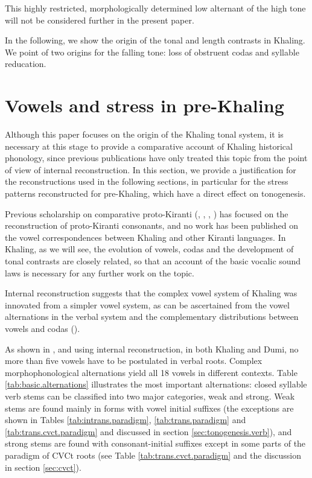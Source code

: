 \documentclass[oldfontcommands,oneside,a4paper,11pt]{article}
\begin{document}
This highly restricted, morphologically determined low alternant of the high tone will not be considered further in the present paper.


In the following, we show the origin of the tonal and length contrasts in Khaling. We point of two origins for the falling tone: loss of obstruent codas and syllable reducation.

\section{Vowels and stress in pre-Khaling}
Although this paper focuses on the origin of the Khaling tonal system, it is necessary at this stage to provide a comparative account of Khaling historical phonology, since previous publications have only treated this topic from the point of view of internal reconstruction. In this section, we provide a justification for the reconstructions used in the following sections,   in particular   for the stress patterns reconstructed for pre-Khaling, which have a direct effect on tonogenesis.

Previous scholarship on comparative proto-Kiranti (\citealt{driem90r}, \citealt{michailovsky94stops}, \citealt{starostin94kiranti}, \citealt{opgenort05jero}) has focused on the reconstruction of proto-Kiranti consonants, and no work has been published on the vowel correspondences between Khaling and other Kiranti languages. In Khaling, as we will see, the evolution of vowels, codas and the development of tonal contrasts are closely related, so that an account of the basic vocalic sound laws is necessary for any further work on the topic.

Internal reconstruction suggests that the complex vowel system of Khaling was innovated from a simpler vowel system, as can be ascertained from the vowel alternations in the verbal system and the complementary distributions between vowels and codas (\citealt{jacques12khaling}). 

As shown in \citet{michailovsky75khaling}, \citet{jacques12khaling} and \citet{michailovsky12dumi} using internal reconstruction, in both Khaling and Dumi, no more than five vowels have to be postulated in verbal roots. Complex morphophonological alternations yield all 18 vowels in different contexts. Table \ref{tab:basic.alternations} illustrates  the most important alternations: closed syllable  verb stems can be classified into two major categories, weak and strong. Weak stems are found mainly in forms with vowel initial suffixes (the exceptions are shown in Tables \ref{tab:intrans.paradigm}, \ref{tab:trans.paradigm} and \ref{tab:trans.cvct.paradigm} and discussed in section \ref{sec:tonogenesis.verb}), and strong stems are   found with consonant-initial suffixes except in some parts of the paradigm of CVCt roots (see Table \ref{tab:trans.cvct.paradigm} and the discussion in section \ref{sec:cvct}).
\end{document}
